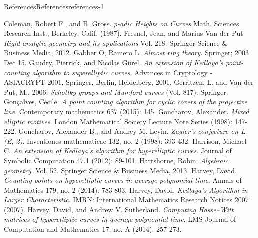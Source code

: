 \documentclass[oneside,10pt,]{book}
\numberwithin{equation}{section}
\begin{document}
\begin{references-chapter-numberless}{References}{}{References}{}{}{references-1}
\begin{thebibliography}{9}
\hypertarget{bib-coleman-gross}{}Coleman, Robert F., and B. Gross. \textit{p-adic Heights on Curves} Math. Sciences Research Inst., Berkeley, Calif. (1987).
\hypertarget{bib-fresnel-van-der-put}{}Fresnel, Jean, and Marius Van der Put \textit{Rigid analytic geometry and its applications} Vol. 218. Springer Science \& Business Media, 2012.
\hypertarget{bib-gabber-ramero}{}Gabber O, Ramero L. \textit{Almost ring theory}. Springer; 2003 Dec 15.
\hypertarget{bib-gaudry-gurel}{}Gaudry, Pierrick, and Nicolas Gürel. \textit{An extension of Kedlaya's point-counting algorithm to superelliptic curves}. Advances in Cryptology - ASIACRYPT 2001, Springer, Berlin, Heidelberg, 2001.
\hypertarget{bib-gerritzen-van-der-put}{}Gerritzen, L. and Van der Put, M., 2006. \textit{Schottky groups and Mumford curves} (Vol. 817). Springer.
\hypertarget{bib-goncalves}{}Gonçalves, Cécile. \textit{A point counting algorithm for cyclic covers of the projective line}. Contemporary mathematics 637 (2015): 145.
\hypertarget{bib-goncharov-mixed}{}Goncharov, Alexander. \textit{Mixed elliptic motives}. London Mathematical Society Lecture Note Series (1998): 147-222.
\hypertarget{bib-gl}{}Goncharov, Alexander B., and Andrey M. Levin. \textit{Zagier's conjecture on L (E, 2)}. Inventiones mathematicae 132, no. 2 (1998): 393-432.
\hypertarget{bib-harrison-hyperelliptic}{}Harrison, Michael C. \textit{An extension of Kedlaya's algorithm for hyperelliptic curves}. Journal of Symbolic Computation 47.1 (2012): 89-101.
\hypertarget{bib-hartshorne}{}Hartshorne, Robin. \textit{Algebraic geometry}. Vol. 52. Springer Science \& Business Media, 2013.
\hypertarget{bib-harvey-average}{}Harvey, David. \textit{Counting points on hyperelliptic curves in average polynomial time}. Annals of Mathematics 179, no. 2 (2014): 783-803.
\hypertarget{bib-harvey-sqrtp}{}Harvey, David. \textit{Kedlaya's Algorithm in Larger Characteristic}. IMRN: International Mathematics Research Notices 2007 (2007).
\hypertarget{bib-harvey-sutherland}{}Harvey, David, and Andrew V. Sutherland. \textit{Computing Hasse–Witt matrices of hyperelliptic curves in average polynomial time}. LMS Journal of Computation and Mathematics 17, no. A (2014): 257-273.

\end{thebibliography}
\end{references-chapter-numberless}
\end{document}
